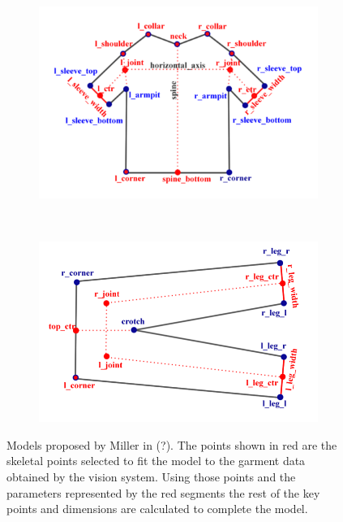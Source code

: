 \begin{figure}[htbp]
	\centering
    \begin{subfigure}[l]{0.49\textwidth}
        \centering
    	\includegraphics[width=\textwidth]
    	{figures/SOTA_Miller_2011.png}
    \end{subfigure}
    ~
    \begin{subfigure}[r]{0.49\textwidth}
	   \centering
		\includegraphics[width=\textwidth]
		{figures/SOTA_Miller_2011-2.png}
	\end{subfigure} 
   	\caption{Models proposed by Miller in  (?). The points shown in red are the skeletal points selected to fit the model to the garment data obtained by the vision system. Using those points and the parameters represented by the red segments the rest of the key points and dimensions are calculated to complete the model.}
   	\label{fig:SOTA_Miller_2011}
\end{figure}

